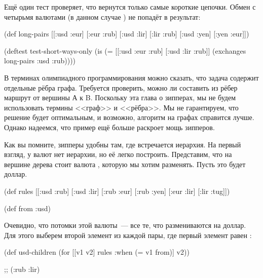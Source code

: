 Ещё один тест проверяет, что вернутся только самые короткие цепочки. Обмен с
четырьмя валютами (в данном случае ) не попадёт в
результат:

\begin{english}
  \begin{clojure}
(def long-pairs
  [[:usd :eur]
   [:eur :rub]
   [:usd :lir]
   [:lir :rub]
   [:usd :yen]
   [:yen :eur]])

(deftest test-short-ways-only
  (is (= [[:usd :eur :rub]
          [:usd :lir :rub]]
         (exchanges long-pairs :usd :rub))))
  \end{clojure}
\end{english}


В терминах олимпиадного программирования можно сказать, что задача содержит
отдельные рёбра графа. Требуется проверить, можно ли составить из рёбер маршрут
от вершины А к B. Поскольку эта глава о зипперах, мы не будем использовать
термины <<граф>> и <<рёбра>>. Мы не гарантируем, что решение будет оптимальным, и
возможно, алгоритм на графах справится лучше. Однако надеемся, что пример ещё
больше раскроет мощь зипперов.

Как вы помните, зипперы удобны там, где встречается иерархия. На первый взгляд,
у валют нет иерархии, но её легко построить. Представим, что на вершине дерева
стоит валюта , которую мы хотим разменять. Пусть это будет доллар.

\begin{english}
  \begin{clojure}
(def rules
  [[:usd :rub]
   [:usd :lir]
   [:rub :eur]
   [:rub :yen]
   [:eur :lir]
   [:lir :tug]])

(def from :usd)
  \end{clojure}
\end{english}


Очевидно, что потомки этой валюты~--- все те, что размениваются на
доллар. Для этого выберем второй элемент из каждой пары, где первый элемент
равен :

\begin{english}
  \begin{clojure}
(def usd-children
  (for [[v1 v2] rules
        :when (= v1 from)]
    v2))

;; (:rub :lir)
  \end{clojure}
\end{english}

